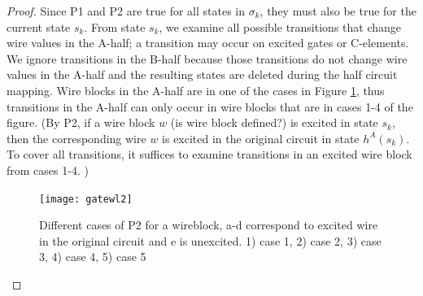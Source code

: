 \documentclass[12pt]{report}
\begin{document}
\begin{proof}
Since P1 and P2 are true for all states in $\sigma_k$, they must also be true for the current state $s_k$. From state $s_k$, we examine all possible transitions that change wire values in the A-half; a transition may occur on excited gates or C-elements.  We ignore transitions in the B-half because those transitions do not change wire values in the A-half and the resulting states are deleted during the half circuit mapping.  Wire blocks in the A-half are in one of the cases in Figure \ref{fig:l1helper}, thus transitions in the A-half can only occur in wire blocks that are in cases 1-4 of the figure.  (By P2, if a wire block $w$ 
(is wire block defined?) 
is excited in state $s_k$, then the corresponding wire $w$ is excited in the original circuit in state $h^A(s_k)$.  To cover all transitions, it suffices to examine transitions in an excited wire block from cases 1-4.  )

 

\begin{figure}
  \centering
    \texttt{[image: gatewl2]}
  \caption{Different cases of P2 for a wireblock, a-d correspond to excited wire in the original circuit and e is unexcited.  1) case 1, 2) case 2, 3) case 3, 4) case 4, 5) case 5}
  \label{fig:l1helper}
\end{figure}


\end{proof}
\end{document}
